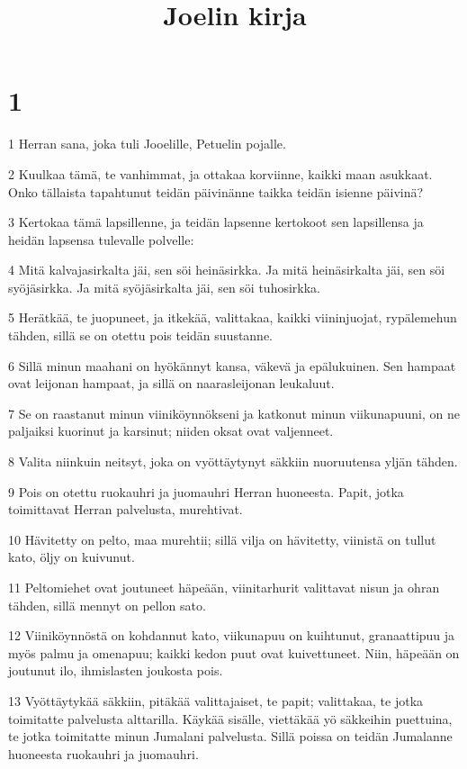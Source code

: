 

\title{Joelin kirja}


\chapter{1}

\par 1 Herran sana, joka tuli Jooelille, Petuelin pojalle.
\par 2 Kuulkaa tämä, te vanhimmat, ja ottakaa korviinne, kaikki maan asukkaat. Onko tällaista tapahtunut teidän päivinänne taikka teidän isienne päivinä?
\par 3 Kertokaa tämä lapsillenne, ja teidän lapsenne kertokoot sen lapsillensa ja heidän lapsensa tulevalle polvelle:
\par 4 Mitä kalvajasirkalta jäi, sen söi heinäsirkka. Ja mitä heinäsirkalta jäi, sen söi syöjäsirkka. Ja mitä syöjäsirkalta jäi, sen söi tuhosirkka.
\par 5 Herätkää, te juopuneet, ja itkekää, valittakaa, kaikki viininjuojat, rypälemehun tähden, sillä se on otettu pois teidän suustanne.
\par 6 Sillä minun maahani on hyökännyt kansa, väkevä ja epälukuinen. Sen hampaat ovat leijonan hampaat, ja sillä on naarasleijonan leukaluut.
\par 7 Se on raastanut minun viiniköynnökseni ja katkonut minun viikunapuuni, on ne paljaiksi kuorinut ja karsinut; niiden oksat ovat valjenneet.
\par 8 Valita niinkuin neitsyt, joka on vyöttäytynyt säkkiin nuoruutensa yljän tähden.
\par 9 Pois on otettu ruokauhri ja juomauhri Herran huoneesta. Papit, jotka toimittavat Herran palvelusta, murehtivat.
\par 10 Hävitetty on pelto, maa murehtii; sillä vilja on hävitetty, viinistä on tullut kato, öljy on kuivunut.
\par 11 Peltomiehet ovat joutuneet häpeään, viinitarhurit valittavat nisun ja ohran tähden, sillä mennyt on pellon sato.
\par 12 Viiniköynnöstä on kohdannut kato, viikunapuu on kuihtunut, granaattipuu ja myös palmu ja omenapuu; kaikki kedon puut ovat kuivettuneet. Niin, häpeään on joutunut ilo, ihmislasten joukosta pois.
\par 13 Vyöttäytykää säkkiin, pitäkää valittajaiset, te papit; valittakaa, te jotka toimitatte palvelusta alttarilla. Käykää sisälle, viettäkää yö säkkeihin puettuina, te jotka toimitatte minun Jumalani palvelusta. Sillä poissa on teidän Jumalanne huoneesta ruokauhri ja juomauhri.
